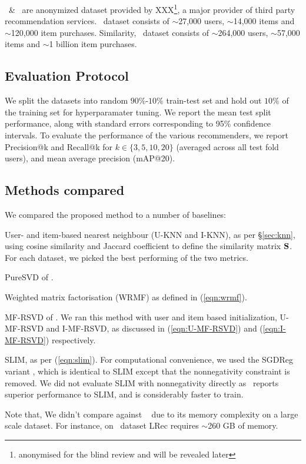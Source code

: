 \Lowes\ \& \Guitar \ are anonymized dataset provided by XXX\footnote{{\scriptsize anonymised for the blind review and will be revealed later}}, a major provider of third party recommendation services. \Guitar \ dataset consists of $\sim$27,000 users, $\sim$14,000 items and $\sim$120,000 item purchases. Similarity, \Lowes \ dataset consists of $\sim$264,000 users, $\sim$57,000 items and $\sim$1 billion item purchases. 

\subsection{Evaluation Protocol}
We split the datasets into random $90\%$-$10\%$ train-test set and hold out $10\%$ of the training set for hyperparamater tuning. We report the mean test split performance, along with standard errors corresponding to 95\% confidence intervals.
To evaluate the performance of the various recommenders, we report Precision@k and Recall@k for $k \in \{ 3, 5, 10, 20 \}$ (averaged across all test fold users), and mean average precision (mAP@20).


\subsection{Methods compared}

We compared the proposed method to a number of baselines:
\begin{compactitem}

	\item User- and item-based nearest neighbour (U-KNN and I-KNN), as per \S\ref{sec:knn}, using  cosine similarity and Jaccard coefficient to define the similarity matrix $\mathbf{S}$. For each dataset, we picked the best performing of the two metrics.

	\item PureSVD of \citet{Cremonesi:2010}.

	\item Weighted matrix factorisation (WRMF) as defined in (\ref{eqn:wrmf}).

	\item MF-RSVD of \citet{Tang:2013}.  We ran this method with user and item based initialization, U-MF-RSVD  and I-MF-RSVD, as discussed in (\ref{eqn:U-MF-RSVD}) and (\ref{eqn:I-MF-RSVD}) respectively.
	\item SLIM, as per (\ref{eqn:slim}). For computational convenience, we used the SGDReg variant \citep{Levy:2013}, which is identical to SLIM  except that the nonnegativity constraint is removed. We did not evaluate SLIM with nonnegativity directly as~\citet{Levy:2013} reports superior performance to SLIM, and is considerably faster to train.
\end{compactitem}
Note that, We didn't compare against ~\citep{Sedhain:2016} due to its memory complexity on a large scale dataset. For instance, on \Lowes \ dataset LRec requires $\sim$260 GB of memory. 